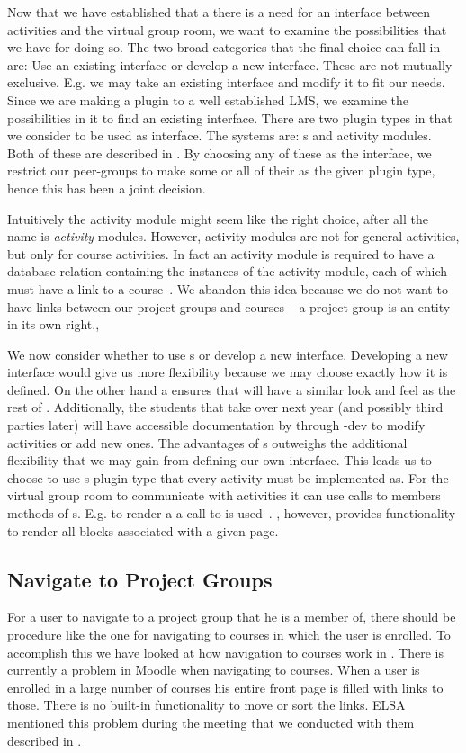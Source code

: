 Now that we have established that a there is a need for an interface between activities and the virtual group room, we want to examine the possibilities that we have for doing so.
The two broad categories that the final choice can fall in are: Use an existing interface or develop a new interface.
These are not mutually exclusive.
E.g. we may take an existing interface and modify it to fit our needs.
Since we are making a plugin to a well established LMS, we examine the possibilities in it to find an existing interface.
There are two plugin types in \moodle{} that we consider to be used as interface.
The systems are: \block{}s and activity modules.
Both of these are described in .
By choosing any of these as the interface, we restrict our peer-groups to make some or all of their \subsystem{} as the given plugin type, hence this has been a joint decision.

Intuitively the activity module might seem like the right choice, after all the name is \emph{activity} modules.
However, activity modules are not for general activities, but only for course activities.
In fact an activity module is required to have a database relation containing the instances of the activity module, each of which must have a link to a course~\cite{moodleactivitymodule}.
We abandon this idea because we do not want to have links between our project groups and courses -- a project group is an entity in its own right.,

We now consider whether to use \block{}s or develop a new interface.
Developing a new interface would give us more flexibility because we may choose exactly how it is defined.
On the other hand a \block{} ensures that \system{} will have a similar look and feel as the rest of \moodle{}.
Additionally, the students that take over next year (and possibly third parties later) will have accessible documentation by through \moodle{}-dev to modify activities or add new ones.
The advantages of \block{}s outweighs the additional flexibility that we may gain from defining our own interface.
This leads us to choose to use \block{}s plugin type that every activity must be implemented as.
For the virtual group room to communicate with activities it can use calls to members methods of \block{}s.
E.g. to render a \block{} a call to  is used~\cite{moodleblockapp}.
, however, provides functionality to render all blocks associated with a given page.


\subsection{Navigate to Project Groups}
\label{sub:designprojectgroupnavigation}
For a user to navigate to a project group that he is a member of, there should be procedure like the one for navigating to courses in which the user is enrolled.
To accomplish this we have looked at how navigation to courses work in \moodle{}.
There is currently a problem in Moodle when navigating to courses. 
When a user is enrolled in a large number of courses his entire front page is filled with links to those.
There is no built-in functionality to move or sort the links.
ELSA mentioned this problem during the meeting that we conducted with them described in .


